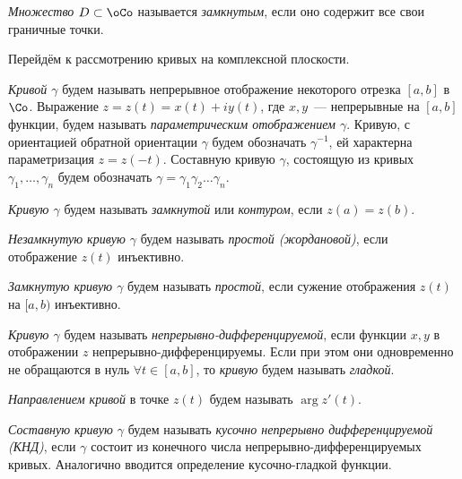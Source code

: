 \begin{definition}
\textit{Множество \(D \subset \oCo\)} называется \textit{замкнутым}, если оно содержит все свои
граничные точки.
\end{definition}

Перейдём к рассмотрению кривых на комплексной плоскости.

\begin{definition}
\textit{Кривой \(\gamma\)} будем называть непрерывное отображение некоторого отрезка \([a, b]\) в
\(\Co\). Выражение \(z = z(t) = x(t) + iy(t)\), где \(x, y\)~--- непрерывные на \([a,b]\) функции,
будем называть \textit{параметрическим отображением \(\gamma\)}. Кривую, с ориентацией обратной
ориентации \(\gamma\) будем обозначать \(\gamma^{-1}\), ей характерна параметризация \(z = z(-t)\).
Составную кривую \(\gamma\), состоящую из кривых \(\gamma_1, \dots, \gamma_n\) будем обозначать
\(\gamma = \gamma_1 \gamma_2 \dots \gamma_n\).
\end{definition}

\begin{definition}
\textit{Кривую \(\gamma\)} будем называть \textit{замкнутой} или \textit{контуром}, если \(z(a) =
z(b)\).
\end{definition}

\begin{definition}
\textit{Незамкнутую кривую \(\gamma\)} будем называть \textit{простой (жордановой)}, если отображение
\(z(t)\) инъективно.
\end{definition}

\begin{definition}
\textit{Замкнутую кривую \(\gamma\)} будем называть \textit{простой}, если сужение отображения
\(z(t)\) на \([a, b)\) инъективно.
\end{definition}

\begin{definition}
\textit{Кривую \(\gamma\)} будем называть \textit{непрерывно-дифференцируемой}, если функции \(x, y\)
в отображении \(z\) непрерывно-дифференцируемы. Если при этом они одновременно не обращаются в нуль
\(\forall t \in [a,b]\), то \textit{кривую} будем называть \textit{гладкой}.
\end{definition}

\begin{definition}
\textit{Направлением кривой} в точке \(z(t)\) будем называть \(\arg{z'(t)}\).
\end{definition}

\begin{definition}
\textit{Составную кривую \(\gamma\)} будем называть \textit{кусочно непрерывно дифференцируемой
(КНД)}, если \(\gamma\) состоит из конечного числа непрерывно-дифференцируемых кривых. Аналогично
вводится определение кусочно-гладкой функции.
\end{definition}

